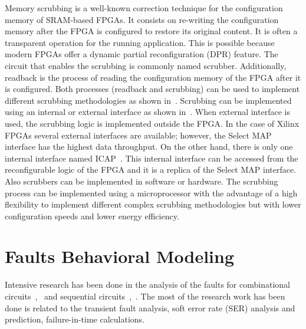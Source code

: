 Memory scrubbing is a well-known correction technique for the configuration memory of SRAM-based FPGAs. It consists on re-writing the configuration memory after the FPGA is configured to restore its original content. It is often a transparent operation for the running application. This is possible because modern FPGAs offer a dynamic partial reconfiguration (DPR) feature. The circuit that enables the scrubbing is commonly named scrubber. Additionally, readback is the process of reading the configuration memory of the FPGA after it is configured. Both processes (readback and scrubbing) can be used to implement different scrubbing methodologies as shown in~\cite{herrera2013design}. Scrubbing can be implemented using an internal or external interface as shown in~\cite{berg2008effectiveness}. When external interface is used, the scrubbing logic is implemented outside the FPGA. In the case of Xilinx FPGAs several external interfaces are available; however, the Select MAP interface has the highest data throughput. On the other hand, there is only one internal interface named ICAP~\cite{xilinx}. This internal interface can be accessed from the reconfigurable logic of the FPGA and it is a replica of the Select MAP interface. Also scrubbers can be implemented in software or hardware. The scrubbing process can be implemented using a microprocessor with the advantage of a high flexibility to implement different complex scrubbing methodologies but with lower configuration speeds and lower energy efficiency.

\section{Faults Behavioral Modeling}



Intensive research has been done in the analysis of the faults for combinational circuits~\cite{mitra2005robust},~\cite{miskov2006mars} and sequential circuits~\cite{asadi2005soft},~\cite{miskov2007soft}. The most of the research work has been done is related to the transient fault analysis, soft error rate (SER) analysis and prediction, failure-in-time calculations. 

